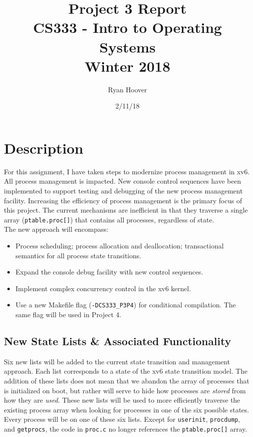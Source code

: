 \documentclass[11pt,letterpaper]{report}
\author{Ryan Hoover}
\title{Project 3 Report\\CS333 - Intro to Operating Systems\\ Winter 2018}
\date{2/11/18}
\begin{document}
	
	\maketitle{}
	
	\section{Description}
	
	For this assignment, I have taken steps to modernize process management in xv6. All process management is impacted. New console control sequences have been implemented to support testing and debugging of the new process management facility. Increasing the efficiency of process management is the primary focus of this project. The current mechanisms are inefficient in that they traverse a single array ({\tt ptable.proc[]}) that contains all processes, regardless of state.\\
	
	The new approach will encompass: 
	\begin{itemize}
	\item Process scheduling; process allocation and deallocation; transactional semantics for all process state transitions.
	\item Expand the console debug facility with new control sequences.
	\item Implement complex concurrency control in the xv6 kernel.
	\item Use a new Makefile flag ({\tt -DCS333\_P3P4}) for conditional compilation. The same flag will be used in Project 4.
	\end{itemize}

	\subsection{New State Lists \& Associated Functionality}
	Six new lists will be added to the current state transition and management approach. Each list corresponds to a state of the xv6 state transition model. The addition of these lists does not mean that we abandon the array of processes that is initialized on boot, but rather will serve to hide how processes are \emph{stored} from how they are \emph{used}. These new lists will be used to more efficiently traverse the existing process array when looking for processes in one of the six possible states.\\
	Every process will be on one of these six lists. Except for {\tt userinit}, {\tt procdump}, and {\tt getprocs}, the code in {\tt proc.c} no longer references the {\tt ptable.proc[]} array.
	
\end{document}
